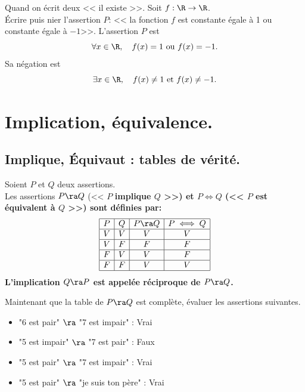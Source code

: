 \documentclass[11pt]{article}
\begin{document}
\begin{ex}{Quand on écrit deux << il existe >>.}{}
    Soit $f:\R\to\R$.\\
    Écrire puis nier l'assertion $P$: << la fonction $f$ est constante égale à 1 ou constante égale à $-1$>>.
    \tcblower
    L'assertion $P$ est
    \begin{equation*}
        \forall x\in\R,\quad f(x)=1\text{ ou }f(x)=-1.
    \end{equation*}
    Sa négation est
    \begin{equation*}
        \exists x\in\R,\quad f(x)\neq 1\text{ et }f(x)\neq -1.
    \end{equation*}
\end{ex}

\section{Implication, équivalence.}

\subsection{Implique, Équivaut : tables de vérité.}

\begin{defi}{}{}
    Soient $P$ et $Q$ deux assertions.\\
    Les assertions $P\ra Q$ (<< $P$ \bf{implique} $Q$ >>) et $P\iff Q$ (<< $P$ est \bf{équivalent} à $Q$ >>) sont définies par:
    \begin{equation*}
        \begin{array}{|c|c|c|c|c|}
            \hline
            P&Q&P\ra Q&P\iff Q\\
            \hline
            V&V&V&V\\
            \hline
            V&F&F&F\\
            \hline
            F&V&V&F\\
            \hline
            F&F&V&V\\
            \hline
        \end{array}
    \end{equation*}
    L'implication $Q\ra P$ est appelée \bf{réciproque} de $P\ra Q$.
\end{defi}

\begin{ex}{}{}
    Maintenant que la table de $P\ra Q$ est complète, évaluer les assertions suivantes.
    \begin{itemize}
        \item "6 est pair" $\ra$ "7 est impair" : Vrai
        \item "5 est impair" $\ra$ "7 est pair" : Faux
        \item "5 est pair" $\ra$ "7 est impair" : Vrai
        \item "5 est pair" $\ra$ "je suis ton père" : Vrai 
    \end{itemize}
\end{ex}
\end{document}
